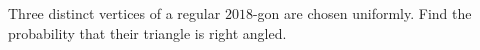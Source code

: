 Three distinct vertices of a regular $2018$-gon are chosen uniformly. Find the probability that their triangle is right angled.

